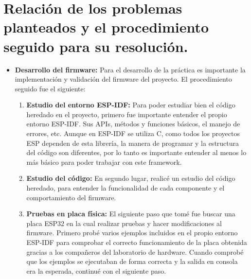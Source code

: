 \documentclass[a4paper,11pt]{article}
\begin{document}
\section{Relación de los problemas planteados y el procedimiento seguido para su resolución.}
\begin{itemize}
	\item \textbf{Desarrollo del firmware: } Para el desarrollo de la práctica es importante la implementación y validación del firmware del proyecto. El procedimiento seguido fue el siguiente:
	\begin{enumerate}
		\item \textbf{Estudio del entorno ESP-IDF: } Para poder estudiar bien el código heredado en el proyecto, primero fue importante entender el propio entorno ESP-IDF. Sus APIs, métodos y funciones básicos, el manejo de errores, etc. Aunque en ESP-IDF se utiliza C, como todos los proyectos ESP dependen de esta librería, la manera de programar y la estructura del código son diferentes, por lo tanto es importante entender al menos lo más básico para poder trabajar con este framework.
		\item \textbf{Estudio del código: } En segundo lugar, realicé un estudio del código heredado, para entender la funcionalidad de cada componente y el comportamiento del firmware. 
		\item \textbf{Pruebas en placa física: } El siguiente paso que tomé fue buscar una placa ESP32 en la cual realizar pruebas y hacer modificaciones al firmware. Primero probé varios ejemplos incluidos en el propio entorno ESP-IDF para comprobar el correcto funcionamiento de la placa obtenida gracias a los compañeros del laboratorio de hardware. Cuando comprobé que los ejemplos se ejecutaban de forma correcta y la salida en consola era la esperada, continué con el siguiente paso.

\end{enumerate}
\end{itemize}
\end{document}
